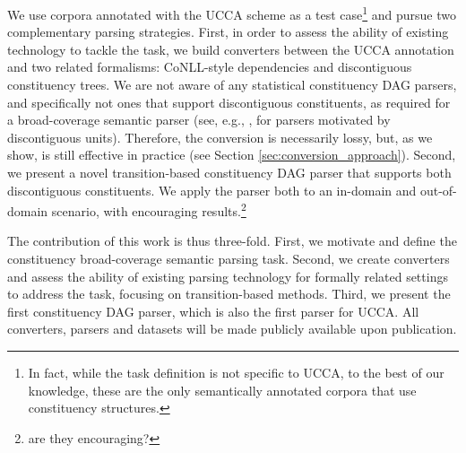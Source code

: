 \documentclass[11pt]{article}
\newcommand{\oa}[1]{\footnote{\color{red} #1}}
\newcommand{\secref}[1]{Section \ref{#1}}
\begin{document}
We use corpora annotated with the UCCA scheme \cite{abend2013universal} as a test
case\footnote{In fact, while the task definition is not specific to UCCA,
  to the best of our knowledge, these are the only 
  semantically annotated corpora that use constituency structures.}
and pursue two complementary parsing strategies.
First, in order to assess the ability of existing technology to tackle the task,
we build converters between the UCCA annotation and two related formalisms:
CoNLL-style dependencies and discontiguous constituency trees.
We are not aware of any statistical constituency DAG parsers, and specifically not
ones that support discontiguous constituents, as required for a broad-coverage semantic
parser (see, e.g., \cite{pitler2015linear,maier2015discontinuous}, for parsers motivated by discontiguous units). Therefore, the conversion is necessarily lossy, but, as we show, is still effective
in practice (see \secref{sec:conversion_approach}).
Second, we present a novel transition-based
constituency DAG parser that supports both discontiguous constituents.
We apply the parser both to an in-domain and out-of-domain
scenario, with encouraging results.\oa{are they encouraging?}


The contribution of this work is thus three-fold.
First, we motivate and define the constituency broad-coverage semantic parsing task.
Second, we create converters and assess the ability of existing parsing technology
for formally related settings to address the task, focusing on transition-based methods.
Third, we present the first constituency DAG parser, which is also the
first parser for UCCA. 
All converters, parsers and datasets will be made publicly available upon publication.
\end{document}
